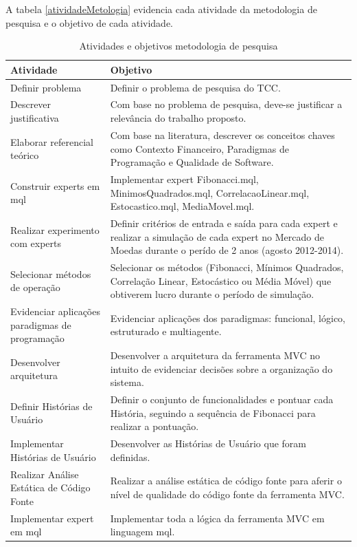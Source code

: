 A tabela \ref{atividadeMetologia}  evidencia cada atividade da metodologia de pesquisa e o objetivo de cada atividade.

\begin{table}[htp]
\caption{Atividades e objetivos metodologia de pesquisa}
\begin{center}
    \begin{tabular}{ | p{5cm} | p{9cm} |}
    \hline
    \textbf{Atividade} & \textbf{Objetivo} \\ \hline
	Definir problema & Definir o problema de pesquisa do TCC.\\ \hline
	Descrever justificativa & Com base no problema de pesquisa, deve-se justificar a relevância do trabalho proposto.\\ \hline
	Elaborar referencial teórico & Com base na literatura, descrever os conceitos chaves como Contexto Financeiro, Paradigmas de Programação e Qualidade de Software.\\ \hline
	Construir experts em mql & Implementar expert Fibonacci.mql, MinimosQuadrados.mql, CorrelacaoLinear.mql, Estocastico.mql, MediaMovel.mql. \\ \hline
	Realizar experimento com experts & Definir critérios de entrada e saída para cada expert e realizar a simulação de cada expert no Mercado de Moedas durante o perído de 2 anos (agosto 2012-2014).\\ \hline
	Selecionar métodos de operação & Selecionar os métodos (Fibonacci, Mínimos Quadrados, Correlação Linear, Estocástico ou Média Móvel) que obtiverem lucro durante o período de simulação.\\ \hline
	Evidenciar aplicações paradigmas de programação & Evidenciar aplicações dos paradigmas: funcional, lógico, estruturado e multiagente.\\ \hline
	Desenvolver arquitetura & Desenvolver a arquitetura da ferramenta MVC no intuito de evidenciar decisões sobre a organização do sistema.\\ \hline
	Definir Histórias de Usuário & Definir o conjunto de funcionalidades e pontuar cada História, seguindo a sequência de Fibonacci para realizar a pontuação.\\ \hline
	Implementar Histórias de Usuário & Desenvolver as Histórias de Usuário que foram definidas.\\ \hline
	Realizar Análise Estática de Código Fonte & Realizar a análise estática de código fonte para aferir o nível de qualidade do código fonte da ferramenta MVC.\\ \hline
	Implementar expert em mql & Implementar toda a lógica da ferramenta MVC em linguagem mql.\\ \hline

\end{tabular}
\end{center}
\end{table}
